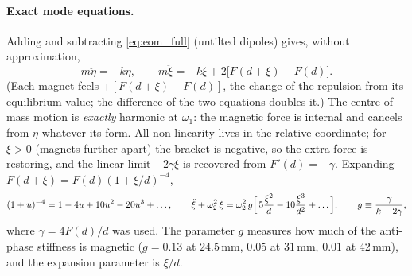 \documentclass[11pt,a4paper]{article}
\newcommand{\un}[1]{\,\mathrm{#1}}
\begin{document}
\paragraph{Exact mode equations.} Adding and subtracting \eqref{eq:eom_full} (untilted dipoles) gives, without approximation,
\begin{equation}
m\ddot\eta=-k\eta,\qquad m\ddot\xi=-k\xi+2\bigl[F(d+\xi)-F(d)\bigr].
\label{eq:exact}
\end{equation}
(Each magnet feels $\mp[F(d+\xi)-F(d)]$, the change of the repulsion from its equilibrium value; the difference of the two equations doubles it.) The centre-of-mass motion is \emph{exactly} harmonic at $\omega_1$: the magnetic force is internal and cancels from $\eta$ whatever its form. All non-linearity lives in the relative coordinate; for $\xi>0$ (magnets further apart) the bracket is negative, so the extra force is restoring, and the linear limit $-2\gamma\xi$ is recovered from $F'(d)=-\gamma$. Expanding $F(d+\xi)=F(d)(1+\xi/d)^{-4}$,
\begin{equation}
(1+u)^{-4}=1-4u+10u^2-20u^3+\dots,\qquad
\ddot\xi+\omega_2^2\,\xi=\omega_2^2\,g\Bigl[\,5\frac{\xi^2}{d}-10\frac{\xi^3}{d^2}+\dots\Bigr],\qquad g\equiv\frac{\gamma}{k+2\gamma},
\label{eq:xi_nl}
\end{equation}
where $\gamma=4F(d)/d$ was used. The parameter $g$ measures how much of the anti-phase stiffness is magnetic ($g=0.13$ at $24.5\un{mm}$, $0.05$ at $31\un{mm}$, $0.01$ at $42\un{mm}$), and the expansion parameter is $\xi/d$.
\end{document}
